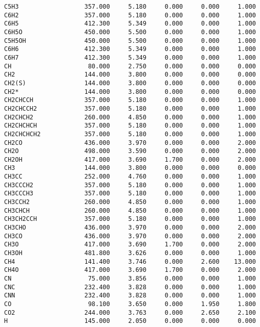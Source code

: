 \begin{verbatim}
C5H3                  357.000     5.180     0.000     0.000     1.000
C6H2                  357.000     5.180     0.000     0.000     1.000
C6H5                  412.300     5.349     0.000     0.000     1.000
C6H5O                 450.000     5.500     0.000     0.000     1.000
C5H5OH                450.000     5.500     0.000     0.000     1.000
C6H6                  412.300     5.349     0.000     0.000     1.000
C6H7                  412.300     5.349     0.000     0.000     1.000
CH                     80.000     2.750     0.000     0.000     0.000
CH2                   144.000     3.800     0.000     0.000     0.000
CH2(S)                144.000     3.800     0.000     0.000     0.000
CH2*                  144.000     3.800     0.000     0.000     0.000
CH2CHCCH              357.000     5.180     0.000     0.000     1.000
CH2CHCCH2             357.000     5.180     0.000     0.000     1.000
CH2CHCH2              260.000     4.850     0.000     0.000     1.000
CH2CHCHCH             357.000     5.180     0.000     0.000     1.000
CH2CHCHCH2            357.000     5.180     0.000     0.000     1.000
CH2CO                 436.000     3.970     0.000     0.000     2.000
CH2O                  498.000     3.590     0.000     0.000     2.000
CH2OH                 417.000     3.690     1.700     0.000     2.000
CH3                   144.000     3.800     0.000     0.000     0.000
CH3CC                 252.000     4.760     0.000     0.000     1.000
CH3CCCH2              357.000     5.180     0.000     0.000     1.000
CH3CCCH3              357.000     5.180     0.000     0.000     1.000
CH3CCH2               260.000     4.850     0.000     0.000     1.000
CH3CHCH               260.000     4.850     0.000     0.000     1.000
CH3CH2CCH             357.000     5.180     0.000     0.000     1.000
CH3CHO                436.000     3.970     0.000     0.000     2.000
CH3CO                 436.000     3.970     0.000     0.000     2.000
CH3O                  417.000     3.690     1.700     0.000     2.000
CH3OH                 481.800     3.626     0.000     0.000     1.000
CH4                   141.400     3.746     0.000     2.600    13.000
CH4O                  417.000     3.690     1.700     0.000     2.000
CN                     75.000     3.856     0.000     0.000     1.000
CNC                   232.400     3.828     0.000     0.000     1.000
CNN                   232.400     3.828     0.000     0.000     1.000
CO                     98.100     3.650     0.000     1.950     1.800
CO2                   244.000     3.763     0.000     2.650     2.100
H                     145.000     2.050     0.000     0.000     0.000

\end{verbatim}
